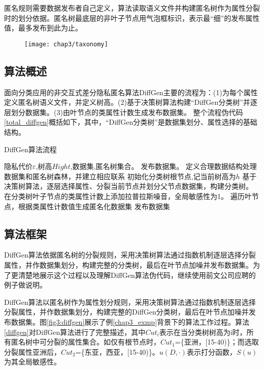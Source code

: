 匿名规则需要数据发布者自己定义，算法读取语义文件并构建匿名树作为属性分裂时的划分依据。匿名树最底层的非叶子节点用气泡框标识，表示最“细”的发布属性值，最多发布到此为止。

\begin{figure}[!htp]
	\centering
	\texttt{[image: chap3/taxonomy]}
\end{figure}


\subsection{算法概述}

面向分类应用的非交互式差分隐私匿名算法DiffGen主要的流程为：(1)为每个属性定义匿名树语义文件，并定义树高。(2)基于决策树算法构建“DiffGen分类树”并逐层划分数据集。(3)由叶节点的类属性计数生成发布数据集。
整个流程伪代码\ref{total_diffgen}概括如下，其中，“DiffGen分类树”是数据集划分、属性选择的基础结构。

\begin{algorithm}[H]
	\caption{DiffGen算法流程} 
	\label{total_diffgen}
	\begin{algorithmic}[1]
		\REQUIRE 隐私代价$\varepsilon$,树高$Hight$,数据集,匿名树集合。
		\ENSURE 发布数据集。
		\STATE 定义合理数据结构处理数据集和匿名树森林，并建立相应联系
		\STATE 初始化分类树根节点,记当前树高为$h$
		\STATE 基于决策树算法，逐层选择属性、分裂当前节点并划分父节点数据集，构建分类树。
		\ENDWHILE
		\STATE 在分类树叶子节点的类属性计数上添加拉普拉斯噪音，全局敏感性为1。
		\STATE 遍历叶节点，根据类属性计数值生成匿名化数据集
		\RETURN 发布数据集
	\end{algorithmic}
\end{algorithm}


\subsection{算法框架}

DiffGen算法依据匿名树的分裂规则，采用决策树算法通过指数机制逐层选择分裂属性，并作数据集划分，构建完整的分类树，最后在叶节点加噪并发布数据集。为了更清楚地展示这个过程以及理解DiffGen算法伪代码，继续使用前文公司应聘的例子做说明。

DiffGen算法以匿名树作为属性划分规则，采用决策树算法通过指数机制逐层选择分裂属性，并作数据集划分，构建完整的DiffGen分类树，最后在叶节点加噪并发布数据集。图\ref{fig3:diffgen}展示了例\ref{chap3_exmp}背景下的算法工作过程。算法\ref{diffgen}对DiffGen算法进行了完整描述，其中$Cut_{i}$表示在当分类树树高为i时，所有匿名树中可分裂的属性集合。如仅有根节点时，$Cut_{1}$=\{亚洲，[15-40)\}；而选取分裂属性亚洲后，$Cut_{2}$=\{东亚，西亚，[15-40)\}。$u(D,\cdotp)$表示打分函数，$S(u)$为其全局敏感性。

